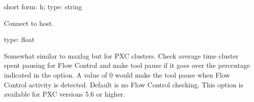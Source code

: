 \documentclass[letterpaper,10pt,english]{sphinxmanual}
\begin{document}

\begin{fulllineitems}
\label{\detokenize{mariadb-schema-change:cmdoption-mariadb-schema-change-host}}
short form: \sphinxhyphen{}h; type: string

Connect to host.

\end{fulllineitems}


\begin{fulllineitems}
\label{\detokenize{mariadb-schema-change:cmdoption-mariadb-schema-change-max-flow-ctl}}
type: float

Somewhat similar to \textendash{}max\sphinxhyphen{}lag but for PXC clusters.
Check average time cluster spent pausing for Flow Control and make tool pause if
it goes over the percentage indicated in the option.
A value of 0 would make the tool pause when  Flow Control activity is
detected.
Default is no Flow Control checking.
This option is available for PXC versions 5.6 or higher.

\end{fulllineitems}
\end{document}

